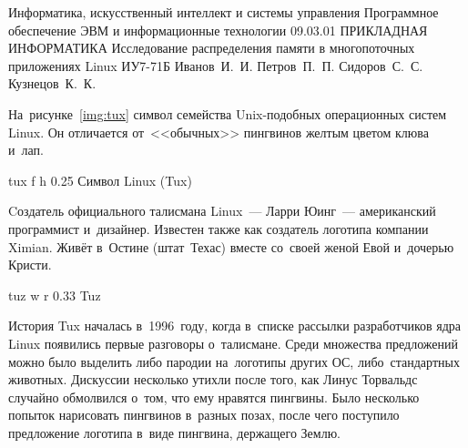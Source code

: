 \documentclass{bmstu}
\begin{document}



\makecourseworktitle
    {Информатика, искусственный интеллект и системы управления} %
    {Программное обеспечение ЭВМ и информационные технологии} %
    {09.03.01 ПРИКЛАДНАЯ ИНФОРМАТИКА} %
    {Исследование распределения памяти в многопоточных приложениях Linux} %
    {ИУ7-71Б} %
    {Иванов~И.~И.} %
    {Петров~П.~П.} %
    {Сидоров~С.~С.} %
    {Кузнецов~К.~К.} %





На~рисунке~\ref{img:tux} символ семейства Unix-подобных операционных систем Linux.
Он отличается от~<<обычных>> пингвинов желтым цветом клюва и~лап.

    {tux} %
    {f} %
    {h} %
    {0.25\textwidth} %
    {Символ Linux (Tux)} %

Cоздатель официального талисмана Linux~--- Ларри Юинг~--- американский программист и~дизайнер.
Известен также как создатель логотипа компании Ximian.
Живёт в~Остине (штат~Техас) вместе со~своей женой Евой и~дочерью Кристи.


    {tuz} %
    {w} %
    {r} %
    {0.33\textwidth} %
    {Tuz} %

История Tux началась в~1996~году, когда в~списке рассылки разработчиков ядра Linux появились первые разговоры о~талисмане.
Среди множества предложений можно было выделить либо пародии на~логотипы других ОС, либо~стандартных животных.
Дискуссии несколько утихли после того, как Линус Торвальдс случайно обмолвился о~том, что ему нравятся пингвины.
Было несколько попыток нарисовать пингвинов в~разных позах, после чего поступило предложение логотипа в~виде пингвина, держащего Землю.
\end{document}
